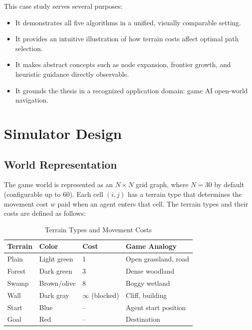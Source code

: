 \documentclass[12pt, a4paper, oneside]{report}
\theoremstyle{definition}
\begin{document}
This case study serves several purposes:

\begin{itemize}
    \item It demonstrates all five algorithms in a unified, visually comparable setting.
    \item It provides an intuitive illustration of how terrain costs affect optimal path selection.
    \item It makes abstract concepts such as node expansion, frontier growth, and heuristic guidance directly observable.
    \item It grounds the thesis in a recognized application domain: game AI open-world navigation.
\end{itemize}

\section{Simulator Design}

\subsection{World Representation}

The game world is represented as an $N \times N$ grid graph, where $N = 30$ by default (configurable up to 60). Each cell $(i, j)$ has a terrain type that determines the movement cost $w$ paid when an agent enters that cell. The terrain types and their costs are defined as follows:

\begin{table}[H]
\centering
\caption{Terrain Types and Movement Costs}
\label{tab:terrain}
\begin{tabular}{llll}
\toprule
\textbf{Terrain} & \textbf{Color} & \textbf{Cost} & \textbf{Game Analogy} \\
\midrule
Plain  & Light green  & 1  & Open grassland, road \\
Forest & Dark green   & 3  & Dense woodland \\
Swamp  & Brown/olive  & 8  & Boggy wetland \\
Wall   & Dark gray    & $\infty$ (blocked) & Cliff, building \\
Start  & Blue         & -- & Agent start position \\
Goal   & Red          & -- & Destination \\
\bottomrule
\end{tabular}
\end{table}
\end{document}
